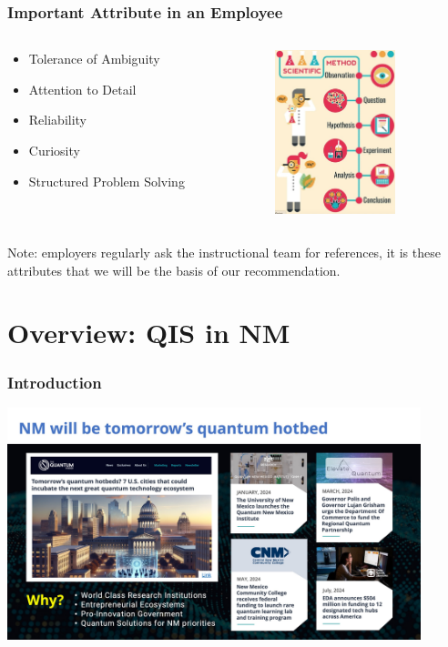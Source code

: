 \documentclass{beamer}
\begin{document}
\begin{frame}\frametitle{Important Attribute in an Employee}
\begin{columns}
\begin{column}{5cm}
\begin{itemize}
\item Tolerance of Ambiguity
\item Attention to Detail
\item Reliability 
\item Curiosity
\item Structured Problem Solving
\end{itemize}
\end{column}
\begin{column}{5cm}
\begin{center}
\includegraphics[width=3.5cm]{fig/scimeth.jpg}
\end{center}

\end{column}
\end{columns}


\vspace{1cm}

Note: employers regularly ask the instructional team for references, it is these attributes that we will be the basis of our recommendation. 
\end{frame}

\section{Overview: QIS in NM}

\begin{frame}\frametitle{Introduction}
\begin{center}
\includegraphics[width=12cm]{fig/Slide2.jpeg}
\end{center}
\end{frame}
\end{document}
